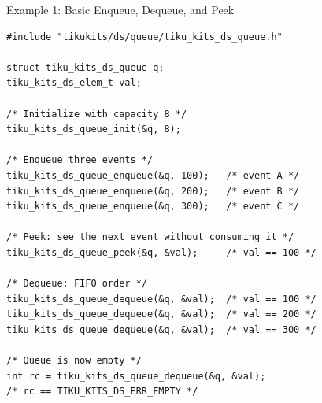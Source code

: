 \documentclass[aspectratio=169, 10pt]{beamer}
\begin{document}
\begin{frame}[fragile]{Example 1: Basic Enqueue, Dequeue, and Peek}
\begin{lstlisting}[style=cstyle,
  title={Basic queue usage}]
#include "tikukits/ds/queue/tiku_kits_ds_queue.h"

struct tiku_kits_ds_queue q;
tiku_kits_ds_elem_t val;

/* Initialize with capacity 8 */
tiku_kits_ds_queue_init(&q, 8);

/* Enqueue three events */
tiku_kits_ds_queue_enqueue(&q, 100);   /* event A */
tiku_kits_ds_queue_enqueue(&q, 200);   /* event B */
tiku_kits_ds_queue_enqueue(&q, 300);   /* event C */

/* Peek: see the next event without consuming it */
tiku_kits_ds_queue_peek(&q, &val);     /* val == 100 */

/* Dequeue: FIFO order */
tiku_kits_ds_queue_dequeue(&q, &val);  /* val == 100 */
tiku_kits_ds_queue_dequeue(&q, &val);  /* val == 200 */
tiku_kits_ds_queue_dequeue(&q, &val);  /* val == 300 */

/* Queue is now empty */
int rc = tiku_kits_ds_queue_dequeue(&q, &val);
/* rc == TIKU_KITS_DS_ERR_EMPTY */
\end{lstlisting}
\end{frame}
\end{document}
